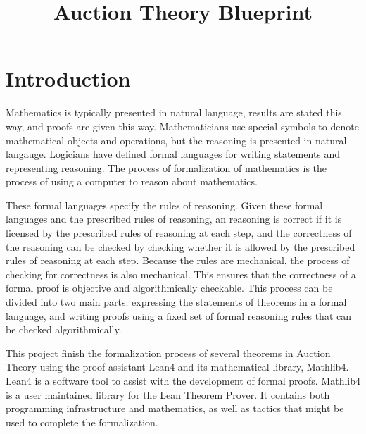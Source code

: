 \title{Auction Theory Blueprint} 




\maketitle


\tableofcontents
\section{Introduction}
Mathematics is typically presented in natural language, results are stated this way, and proofs are given this way. Mathematicians use special symbols to denote mathematical objects and operations, but the reasoning is presented in natural langauge. Logicians have defined formal languages for writing statements and representing reasoning. The process of formalization of mathematics is the process of using a computer to reason about mathematics.

These formal languages specify the rules of reasoning. Given these formal languages and the prescribed rules of reasoning, an reasoning is correct if it is licensed by the prescribed rules of reasoning at each step, and the correctness of the reasoning can be checked by checking whether it is allowed by the prescribed rules of reasoning at each step. Because the rules are mechanical, the process of checking for correctness is also mechanical. This ensures that the correctness of a formal proof is objective and algorithmically checkable.
This process can be divided into two main parts: expressing the statements of theorems in a formal language, and writing proofs using a fixed set of formal reasoning rules that can be checked algorithmically.

This project finish the formalization process of several theorems in Auction Theory using the proof assistant Lean4 and its mathematical library, Mathlib4. Lean4 is a software tool to assist with the development of formal proofs. Mathlib4 is a user maintained library for the Lean Theorem Prover. It contains both programming infrastructure and mathematics, as well as tactics that might be used to complete the formalization.

